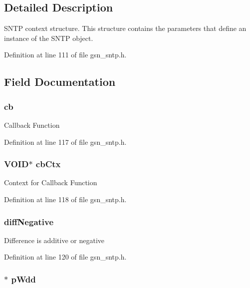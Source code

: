 \subsection{Detailed Description}
SNTP context structure. This structure contains the parameters that define an instance of the SNTP object. 

Definition at line 111 of file gsn\_\-sntp.h.



\subsection{Field Documentation}
\hypertarget{a00227_a44a3261584f04cfe1ae8e254fcea6b61}{
\subsubsection[{cb}]{ {\bf cb}}}
\label{a00227_a44a3261584f04cfe1ae8e254fcea6b61}
Callback Function 

Definition at line 117 of file gsn\_\-sntp.h.

\hypertarget{a00227_abc1717c5357c7dda5c2abef096a06f1f}{
\subsubsection[{cbCtx}]{\setlength{\rightskip}{0pt plus 5cm}VOID$\ast$ {\bf cbCtx}}}
\label{a00227_abc1717c5357c7dda5c2abef096a06f1f}
Context for Callback Function 

Definition at line 118 of file gsn\_\-sntp.h.

\hypertarget{a00227_ab4a2b87d4c1759e4e8bd2e472d2a0985}{
\subsubsection[{diffNegative}]{ {\bf diffNegative}}}
\label{a00227_ab4a2b87d4c1759e4e8bd2e472d2a0985}
Difference is additive or negative 

Definition at line 120 of file gsn\_\-sntp.h.

\hypertarget{a00227_a97684b58b7a05f9b282a86a26929e1ba}{
\subsubsection[{pWdd}]{$\ast$ {\bf pWdd}}}
\label{a00227_a97684b58b7a05f9b282a86a26929e1ba}



